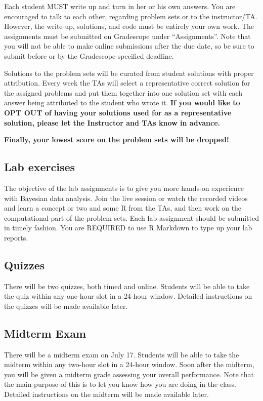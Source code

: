 \documentclass[11pt, a4paper]{article}
\begin{document}
Each student MUST write up and turn in her or his own answers. You are encouraged to talk to each other, regarding problem sets or to the instructor/TA. However, the write-up, solutions, and code must be entirely your own work. The assignments must be submitted on Gradescope under ``Assignments''. Note that you will not be able to make online submissions after the due date, so be sure to submit before or by the Gradescope-specified deadline.

Solutions to the problem sets will be curated from student solutions with proper attribution. Every week the TAs will select a representative correct solution for the assigned problems and put them together into one solution set with each answer being attributed to the student who wrote it. \textbf{If you would like to OPT OUT of having your solutions used for as a representative solution, please let the Instructor and TAs know in advance.}

\textbf{Finally, your lowest score on the problem sets will be dropped!}

\subsection{Lab exercises}
The objective of the lab assignments is to give you more hands-on experience with Bayesian data analysis. Join the live session or watch the recorded videos and learn a concept or two and some R from the TAs, and then work on the computational part of the problem sets. Each lab assignment should be submitted in timely fashion. You are REQUIRED to use R Markdown to type up your lab reports.

\subsection{Quizzes}
There will be two quizzes, both timed and online. Students will be able to take the quiz within any one-hour slot in a 24-hour window. Detailed instructions on the quizzes will be made available later.

\subsection{Midterm Exam}
There will be a midterm exam on July 17.  Students will be able to take the midterm within any two-hour slot in a 24-hour window.  Soon after the midterm, you will be given a midterm grade assessing your overall performance. Note that the main purpose of this is to let you know how you are doing in the class. Detailed instructions on the midterm will be made available later.
\end{document}
